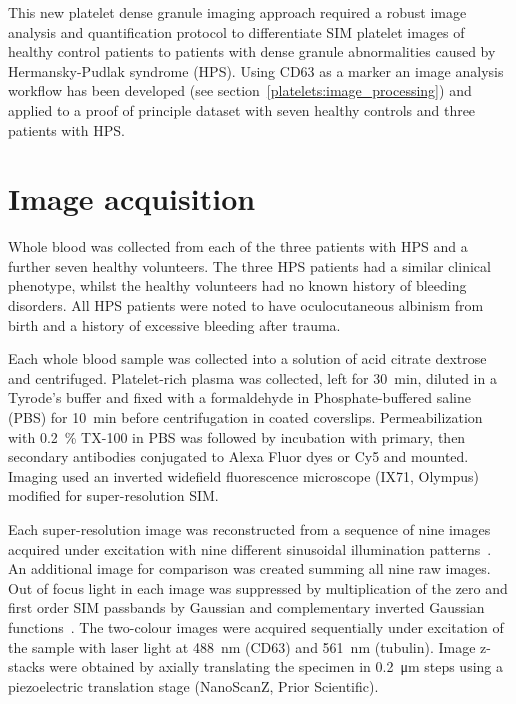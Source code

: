 This new platelet dense granule imaging approach required a robust image analysis and quantification protocol to differentiate SIM platelet images of healthy control patients to patients with dense granule abnormalities caused by Hermansky-Pudlak syndrome (HPS). Using CD63 as a marker an image analysis workflow has been developed (see section~\ref{platelets:image_processing}) and applied to a proof of principle dataset with seven healthy controls and three patients with HPS.

\section{Image acquisition}
\label{platelets:image_acquisition}
Whole blood was collected from each of the three patients with HPS and a further seven healthy volunteers. The three HPS patients had a similar clinical phenotype, whilst the healthy volunteers had no known history of bleeding disorders. All HPS patients were noted to have oculocutaneous albinism from birth and a history of excessive bleeding after trauma.

Each whole blood sample was collected into a solution of acid citrate dextrose and centrifuged. Platelet-rich plasma was collected, left for \SI{30}{\minute}, diluted in a Tyrode’s buffer and fixed with a formaldehyde in Phosphate-buffered saline (PBS) for \SI{10}{\minute} before  centrifugation in coated coverslips. Permeabilization with \SI{0.2}{\percent} TX-100 in PBS was followed by incubation with primary, then secondary antibodies conjugated to Alexa Fluor dyes or Cy5 and mounted. Imaging used an inverted widefield fluorescence microscope (IX71, Olympus) modified for super-resolution SIM.

Each super-resolution image was reconstructed from a sequence of nine images acquired under excitation with nine different sinusoidal illumination patterns~\cite{Gustafsson2008}. An additional image for comparison was created summing all nine raw images. Out of focus light in each image was suppressed by multiplication of the zero and first order SIM passbands by Gaussian and complementary inverted Gaussian functions~\cite{Holleran2014}. The two-colour images were acquired sequentially under excitation of the sample with laser light at \SI{488}{\nano\meter} (CD63) and \SI{561}{\nano\meter} (tubulin). Image z-stacks were obtained by axially translating the specimen in \SI{0.2}{\micro\meter} steps using a piezoelectric translation stage (NanoScanZ, Prior Scientific).


